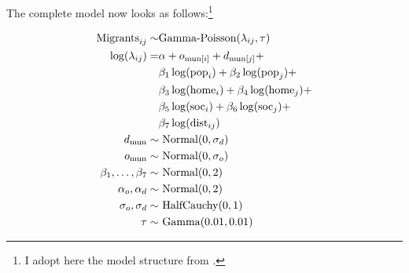 \documentclass[a4paper,fleqn]{cas-dc}
\begin{document}
The complete model now looks as follows:\footnote{I adopt here the model
  structure from \citet{mcelreath2020statistical}.}

\begin{subequations}
  \begin{align} \text{Migrants}_{ij} \sim & \text{Gamma-Poisson}(\lambda_{ij}, \tau) \label{outcome}\\
    \log(\lambda_{ij}) = & \alpha + o_{\text{mun}[i]} + d_{\text{mun}[j]} +
                           \notag \\ & \beta_1 \log(\text{pop}_i) +
                                       \beta_2\log(\text{pop}_j) + \notag \\ &
                                                                               \beta_3
                                                                               \log(\text{home}_i) + \beta_4 \log(\text{home}_j) + \notag\\
                                          & \beta_5 \log(\text{soc}_i) + \beta_6
                                            \log(\text{soc}_j)
                                            + \notag \\ & \beta_7 \log(\text{dist}_{ij}) \label{linear} \\
    d_{\text{mun}} \sim& \text{ Normal}(0, \sigma_d) \label{mund} \\
    o_{\text{mun}} \sim& \text{ Normal}(0, \sigma_o) \label{muno} \\
    \beta_1,\ldots, \beta_7 \sim& \text{
                                  Normal}(0,2)\\ \alpha_o, \alpha_d \sim& \text{ Normal}(0,2)\\
    \sigma_o, \sigma_d \sim& \text{ HalfCauchy}(0,1) \\ \tau \sim& \text{
                                                                   Gamma}(0.01,
                                                                   0.01)
  \end{align}
  \label{model}
\end{subequations}
\end{document}
